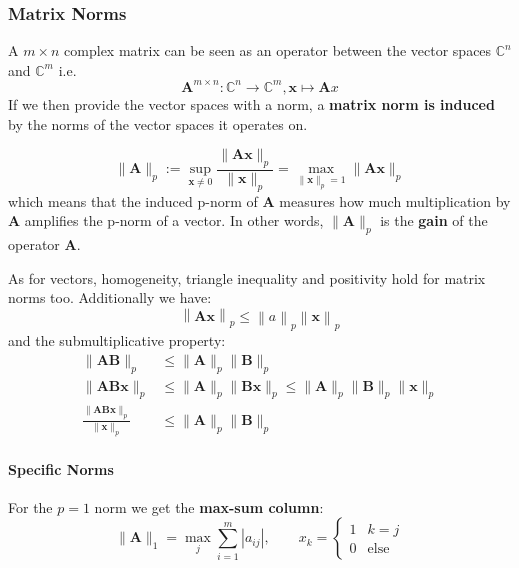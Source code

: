 \subsubsection{Matrix Norms}
A $m\times n$ complex matrix can be seen as an operator between the vector spaces $\mathbb{C}^n$ and $\mathbb{C}^m$ i.e.
\begin{equation*}
    \mathbf{A}^{m\times n}:\mathbb{C}^n\to\mathbb{C}^m,\mathbf{x}\mapsto \mathbf{A}x
\end{equation*}
If we then provide the vector spaces with a norm, a \textbf{matrix norm is induced} by the norms of the vector spaces it operates on.

\begin{equation*}
    \|\mathbf{A}\|_p:=\sup_{\mathbf{x}\neq0}\frac{\|\mathbf{Ax}\|_p}{\|\mathbf{x}\|_p}=\max_{\|\mathbf{x}\|_p=1}\|\mathbf{Ax}\|_p
\end{equation*}
which means that the induced p-norm of $\mathbf{A}$ measures how much multiplication by $\mathbf{A}$ amplifies the p-norm of a vector. In other words, $\|\mathbf{A}\|_p$ is the \textbf{gain} of the operator $\mathbf{A}$.

\newpar{}

As for vectors, homogeneity, triangle inequality and positivity hold for matrix norms too. Additionally we have:
\begin{equation*}
    \left\|\mathbf{Ax}\right\|_p\leq\left\|a\right\|_p\left\|\mathbf{x}\right\|_p
\end{equation*}
and the submultiplicative property:
\begin{align*}
    \|\mathbf{AB}\|_p                                     & \leq\|\mathbf{A}\|_p\|\mathbf{B}\|_p                                                      \\
    \|\mathbf{AB} \mathbf{x}\|_p                          & \leq\|\mathbf{A}\|_p\|\mathbf{Bx}\|_p\leq\|\mathbf{A}\|_p\|\mathbf{B}\|_p\|\mathbf{x}\|_p \\
    \frac{\|\mathbf{AB} \mathbf{x}\|_p}{\|\mathbf{x}\|_p} & \leq\|\mathbf{A}\|_p\|\mathbf{B}\|_p
\end{align*}


\paragraph{Specific Norms}


For the $p = 1$ norm we get the \textbf{max-sum column}:
\begin{equation*}
    \|\mathbf{A}\|_1=\max_j\sum_{i=1}^m|a_{ij}|,\qquad x_k=\begin{cases}
        1 & k=j         \\
        0 & \text{else}
    \end{cases}
\end{equation*}

